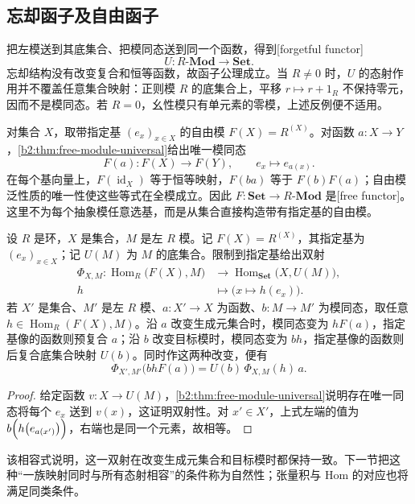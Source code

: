 \subsection{忘却函子及自由函子}
\label{b2:subsec:0501:03}

把左模送到其底集合、把模同态送到同一个函数，得到[forgetful functor]
\[
	U:R\text{-}\mathbf{Mod}\longrightarrow\mathbf{Set}.
\]
忘却结构没有改变复合和恒等函数，故函子公理成立。当 \(R\ne0\) 时，\(U\) 的态射作用并不覆盖任意集合映射：正则模 \(R\) 的底集合上，平移 \(r\mapsto r+1_R\) 不保持零元，因而不是模同态。若 \(R=0\)，幺性模只有单元素的零模，上述反例便不适用。

\ProseParagraphBreak
对集合 \(X\)，取带指定基 \((e_x)_{x\in X}\) 的自由模 \(F(X)=R^{(X)}\)。对函数 \(a:X\rightarrow Y\)，\cref{b2:thm:free-module-universal}给出唯一模同态
\[
	F(a):F(X)\longrightarrow F(Y),\qquad e_x\longmapsto e_{a(x)}.
\]
在每个基向量上，\(F(\operatorname{id}_X)\) 等于恒等映射，\(F(ba)\) 等于 \(F(b)F(a)\)；自由模泛性质的唯一性使这些等式在全模成立。因此 \(F:\mathbf{Set}\rightarrow R\text{-}\mathbf{Mod}\) 是[free functor]。这里不为每个抽象模任意选基，而是从集合直接构造带有指定基的自由模。

\begin{proposition}\label{b2:prop:free-forgetful-bijection}
	设 \(R\) 是环，\(X\) 是集合，\(M\) 是左 \(R\) 模。记 \(F(X)=R^{(X)}\)，其指定基为 \((e_x)_{x\in X}\)；记 \(U(M)\) 为 \(M\) 的底集合。限制到指定基给出双射
	\begin{equation}\label{b2:eq:free-forgetful-bijection}
		\begin{aligned}
			\Phi_{X,M}:\operatorname{Hom}_R\bigl(F(X),M\bigr) &\longrightarrow\operatorname{Hom}_{\mathbf{Set}}\bigl(X,U(M)\bigr),\\
			h&\longmapsto\bigl(x\mapsto h(e_x)\bigr).
		\end{aligned}
	\end{equation}
	若 \(X'\) 是集合、\(M'\) 是左 \(R\) 模、\(a:X'\rightarrow X\) 为函数、\(b:M\rightarrow M'\) 为模同态，取任意 \(h\in\operatorname{Hom}_R(F(X),M)\)。沿 \(a\) 改变生成元集合时，模同态变为 \(hF(a)\)，指定基像的函数则预复合 \(a\)；沿 \(b\) 改变目标模时，模同态变为 \(bh\)，指定基像的函数则后复合底集合映射 \(U(b)\)。同时作这两种改变，便有
	\[
		\Phi_{X',M'}\bigl(bhF(a)\bigr)=U(b)\,\Phi_{X,M}(h)\,a.
	\]
\end{proposition}
\begin{proof}
	给定函数 \(v:X\rightarrow U(M)\)，\cref{b2:thm:free-module-universal}说明存在唯一同态将每个 \(e_x\) 送到 \(v(x)\)，这证明双射性。对 \(x'\in X'\)，上式左端的值为 \(b\Bigl(h\bigl(e_{a(x')}\bigr)\Bigr)\)，右端也是同一个元素，故相等。
\end{proof}

该相容式说明，这一双射在改变生成元集合和目标模时都保持一致。下一节把这种“一族映射同时与所有态射相容”的条件称为自然性；张量积与 Hom 的对应也将满足同类条件。
